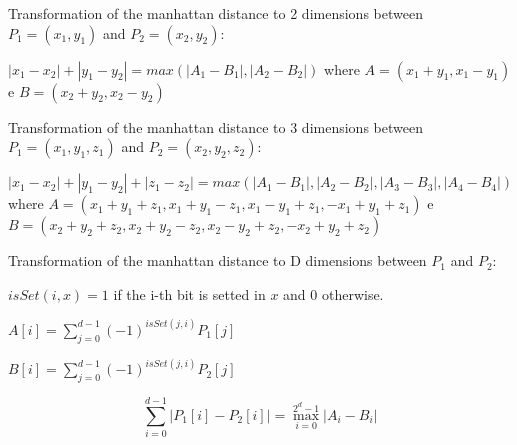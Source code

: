 Transformation of the manhattan distance to 2 dimensions between $P_1=(x_1, y_1)$ and $P_2=(x_2, y_2)$:

$ |x_1 - x_2| + |y_1 - y_2| = max(|A_1-B_1|, |A_2-B_2|)$ where $A=(x_1+y_1, x_1-y_1)$ e $B=(x_2+y_2, x_2-y_2)$

Transformation of the manhattan distance to 3 dimensions between $P_1=(x_1, y_1, z_1)$ and $P_2=(x_2, y_2, z_2)$:

$ |x_1 - x_2| + |y_1 - y_2| + |z_1 - z_2| = max(|A_1-B_1|, |A_2-B_2|, |A_3-B_3|, |A_4-B_4|)$ where $A=(x_1+y_1+z_1, x_1+y_1-z_1, x_1-y_1+z_1, -x_1+y_1+z_1)$ e $B=(x_2+y_2+z_2, x_2+y_2-z_2, x_2-y_2+z_2, -x_2+y_2+z_2)$

Transformation of the manhattan distance to D dimensions between $P_1$ and $P_2$:

$isSet(i, x) = 1$ if the i-th bit is setted in $x$ and 0 otherwise.

$A[i] = \sum_{j=0}^{d-1}(-1)^{isSet(j, i)}P_1[j]$

$B[i] = \sum_{j=0}^{d-1}(-1)^{isSet(j, i)}P_2[j]$

$$\sum_{i = 0}^{d-1} |P_1[i] - P_2[i]| = \max_{i=0}^{2^d - 1}{|A_i - B_i|}$$ 
